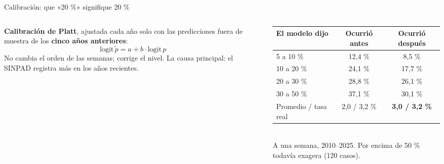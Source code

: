\documentclass[aspectratio=169,11pt]{beamer}
\begin{document}
\begin{frame}{Calibración: que «20 \%» signifique 20 \%}
\begin{columns}[T]
\begin{column}{0.5\textwidth}\small
\textbf{Calibración de Platt}, ajustada cada año solo con las predicciones fuera de muestra de los \textbf{cinco años anteriores}:
\[\text{logit}\,\tilde p = a + b\cdot\text{logit}\,p\]
No cambia el orden de las semanas; corrige el nivel. La causa principal: el SINPAD registra más en los años recientes.
\end{column}
\begin{column}{0.46\textwidth}\scriptsize
\begin{tabular}{@{}lcc@{}}\toprule
El modelo dijo & Ocurrió antes & Ocurrió después\\\midrule
5 a 10 \% & 12,4 \% & 8,5 \%\\
10 a 20 \% & 24,1 \% & 17,7 \%\\
20 a 30 \% & 28,8 \% & 26,1 \%\\
30 a 50 \% & 37,1 \% & 30,1 \%\\\midrule
Promedio / tasa real & 2,0 / 3,2 \% & \textbf{3,0 / 3,2 \%}\\\bottomrule
\end{tabular}\\[4pt]
{\color{gris}A una semana, 2010–2025. Por encima de 50 \% todavía exagera (120 casos).}
\end{column}
\end{columns}
\end{frame}
\end{document}
